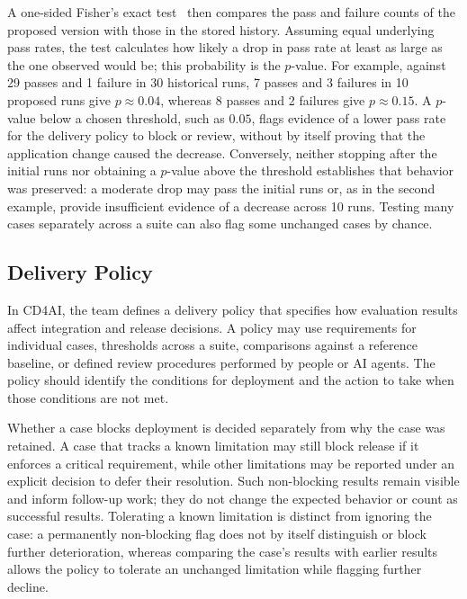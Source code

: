 A one-sided Fisher's exact test~\parencite{Fisher:DesignOfExperiments:1935,
SciPy:FisherExact} then compares the pass and failure counts of the proposed
version with those in the stored history. Assuming equal underlying pass rates,
the test calculates how likely a drop in pass rate at least as large as the one
observed would be; this probability is the $p$-value. For example, against 29
passes and 1 failure in 30 historical runs, 7 passes and 3 failures in 10
proposed runs give $p \approx 0.04$, whereas 8 passes and 2 failures give
$p \approx 0.15$. A $p$-value below a chosen threshold, such as $0.05$, flags
evidence of a lower pass rate for the delivery policy to block or review,
without by itself proving that the application change caused the decrease.
Conversely, neither stopping after the initial runs nor obtaining a $p$-value
above the threshold establishes that behavior was preserved: a moderate drop
may pass the initial runs or, as in the second example, provide insufficient
evidence of a decrease across 10 runs. Testing many cases separately across a
suite can also flag some unchanged cases by chance.

\subsection{Delivery Policy}
\label{sec:cd4ai-delivery-policy}

In CD4AI, the team defines a delivery policy that specifies how evaluation
results affect integration and release decisions. A policy may use
requirements for individual cases, thresholds across a suite, comparisons
against a reference baseline, or defined review procedures performed by people
or AI agents. The policy should identify the conditions for deployment and the
action to take when those conditions are not met.

Whether a case blocks deployment is decided separately from why the case was
retained. A case that tracks a known limitation may still block release if it
enforces a critical requirement, while other limitations may be reported under
an explicit decision to defer their resolution. Such non-blocking results
remain visible and inform follow-up work; they do not change the expected
behavior or count as successful results. Tolerating a known limitation is
distinct from ignoring the case: a permanently non-blocking flag does not by
itself distinguish or block further deterioration, whereas comparing the
case's results with earlier results allows the policy to tolerate an unchanged
limitation while flagging further decline.

